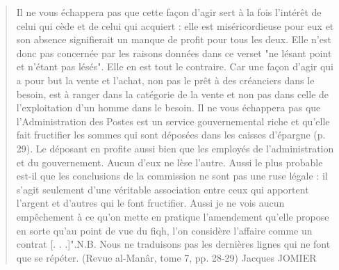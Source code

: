 \begin{quote}
Il ne vous échappera pas que cette façon d'agir sert à la fois l'intérêt de celui
qui cède et de celui qui acquiert : elle est miséricordieuse pour eux et son absence
signifierait un manque de profit pour tous les deux. Elle n'est donc pas concernée
par les raisons données dans ce verset "ne lésant point et n'étant pas lésés". Elle
en est tout le contraire. Car une façon d'agir qui a pour but la vente et l'achat,
non pas le prêt à des créanciers dans le besoin, est à ranger dans la catégorie de la
vente et non pas dans celle de l'exploitation d'un homme dans le besoin. Il ne
vous échappera pas que l'Administration des Postes est un service gouvernemental
riche et qu'elle fait fructifier les sommes qui sont déposées dans les caisses
d'épargne (p. 29). Le déposant en profite aussi bien que les employés de
l'administration et du gouvernement. Aucun d'eux ne lèse l'autre. Aussi le plus probable
est-il que les conclusions de la commission ne sont pas une ruse légale : il s'agit
seulement d'une véritable association entre ceux qui apportent l'argent et d'autres
qui le font fructifier. Aussi je ne vois aucun empêchement à ce qu'on mette en
pratique l'amendement qu'elle propose en sorte qu'au point de vue du fiqh, l'on
considère l'affaire comme un contrat [. . .]".N.B. Nous ne traduisons pas les
dernières lignes qui ne font que se répéter.
(Revue al-Manâr, tome 7, pp. 28-29)
Jacques JOMIER
 \end{quote}